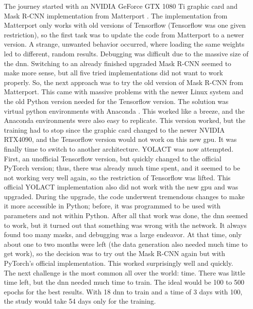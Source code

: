 		The journey started with an NVIDIA GeForce GTX 1080 Ti graphic card and Mask R-CNN implementation from Matterport \cite{Matterport}. The implementation from Matterport only works with old versions of Tensorflow (Tensorflow was one given restriction), so the first task was to update the code from Matterport to a newer version. A strange, unwanted behavior occurred, where loading the same weights led to different, random results. Debugging was difficult due to the massive size of the \acl{dnn}. Switching to an already finished upgraded Mask R-CNN seemed to make more sense, but all five tried implementations did not want to work properly. So, the next approach was to try the old version of Mask R-CNN from Matterport. This came with massive problems with the newer Linux system and the old Python version needed for the Tensorflow version. The solution was virtual python environments with Anaconda \cite{anaconda}. This worked like a breeze, and the Anaconda environments were also easy to replicate. This version worked, but the training had to stop since the graphic card changed to the newer NVIDIA RTX4090, and the Tensorflow version would not work on this new \ac{gpu}. It was finally time to switch to another architecture. YOLACT \cite{Bolya2019} was now attempted. First, an unofficial Tensorflow version, but quickly changed to the official PyTorch version; thus, there was already much time spent, and it seemed to be not working very well again, so the restriction of Tensorflow was lifted. This official YOLACT implementation also did not work with the new \ac{gpu} and was upgraded. During the upgrade, the code underwent tremendous changes to make it more accessible in Python; before, it was programmed to be used with parameters and not within Python. After all that work was done, the \ac{dnn} seemed to work, but it turned out that something was wrong with the network. It always found too many masks, and debugging was a large endeavor. At that time, only about one to two months were left (the data generation also needed much time to get work), so the decision was to try out the Mask R-CNN again but with PyTorch's official implementation. This worked surprisingly well and quickly. \\
		The next challenge is the most common all over the world: time. There was little time left, but the \ac{dnn} needed much time to train. The ideal would be 100 to 500 epochs for the best results. With 18 \ac{dnn} to train and a time of 3 days with 100, the study would take 54 days only for the training.\\
